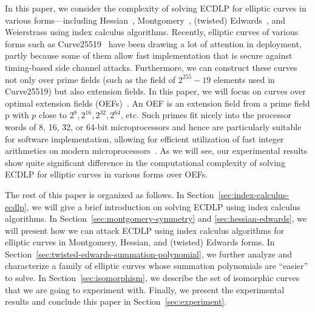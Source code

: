 In this paper, we consider the complexity of solving ECDLP for
elliptic curves in various forms---including
Hessian~\cite{DBLP:conf/ches/Smart01},
Montgomery~\cite{1987-montgomery}, (twisted)
Edwards~\cite{DBLP:journals/iacr/BernsteinL07,DBLP:journals/iacr/BernsteinBJLP08},
and Weierstrass using index calculus algorithms.
%
Recently, elliptic curves of various forms such as
Curve25519~\cite{DBLP:conf/pkc/Bernstein06} have been drawing a lot of
attention in deployment, partly because some of them allow fast
implementation that is secure against timing-based side channel
attacks.
%
Furthermore, we can construct these curves not only over prime fields
(such as the field of $2^{255} - 19$ elements used in Curve25519) but
also extension fields.
%
In this paper, we will focus on curves over optimal extension fields
(OEFs)~\cite{DBLP:conf/crypto/BaileyP98}.
%
An OEF is an extension field from a prime field \F p with $p$ close to
$2^8, 2^{16}, 2^{32}, 2^{64}$, etc.
%
Such primes fit nicely into the processor words of 8, 16, 32, or
64-bit microprocessors and hence are particularly suitable for
software implementation, allowing for efficient utilization of fast
integer arithmetics on modern
microprocessors~\cite{DBLP:conf/crypto/BaileyP98}.
%
As we will see, our experimental results show quite significant
difference in the computational complexity of solving ECDLP for
elliptic curves in various forms over OEFs.

The rest of this paper is organized as follows.
%
In Section~\ref{sec:index-calculus-ecdlp}, we will give a brief
introduction on solving ECDLP using index calculus algorithms.
%
In Section~\ref{sec:montgomery-symmetry} and
\ref{sec:hessian-edwards}, we will present how we can attack ECDLP
using index calculus algorithms for elliptic curves in Montgomery,
Hessian, and (twisted) Edwards forms.
%
In Section~\ref{sec:twisted-edwards-summation-polynomial}, we further
analyze and characterize a family of elliptic curves whose summation
polynomials are ``easier'' to solve.
%
In Section~\ref{sec:isomorphism}, we describe the set of isomorphic
curves that we are going to experiment with.
%
Finally, we present the experimental results and conclude this paper
in Section~\ref{sec:experiment}.